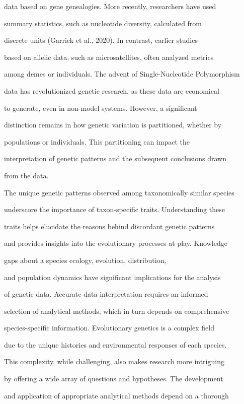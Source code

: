 \documentclass[10pt,twoside]{article}
\numberwithin{equation}{section}
\begin{document}
data based on gene genealogies. More recently, researchers have used

summary statistics, such as nucleotide diversity, calculated from

discrete units (Garrick et al., 2020). In contrast, earlier studies

based on allelic data, such as microsatellites, often analyzed metrics

among demes or individuals. The advent of Single-Nucleotide Polymorphism

data has revolutionized genetic research, as these data are economical

to generate, even in non-model systems. However, a significant

distinction remains in how genetic variation is partitioned, whether by

populations or individuals. This partitioning can impact the

interpretation of genetic patterns and the subsequent conclusions drawn

from the data.



The unique genetic patterns observed among taxonomically similar species

underscore the importance of taxon-specific traits. Understanding these

traits helps elucidate the reasons behind discordant genetic patterns

and provides insights into the evolutionary processes at play. Knowledge

gaps about a species\textquotesingle{} ecology, evolution, distribution,

and population dynamics have significant implications for the analysis

of genetic data. Accurate data interpretation requires an informed

selection of analytical methods, which in turn depends on comprehensive

species-specific information. Evolutionary genetics is a complex field

due to the unique histories and environmental responses of each species.

This complexity, while challenging, also makes research more intriguing

by offering a wide array of questions and hypotheses. The development

and application of appropriate analytical methods depend on a thorough
\end{document}
